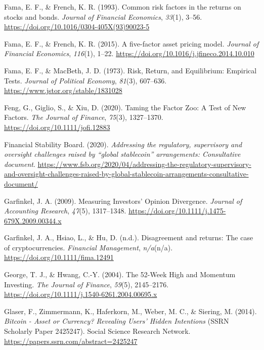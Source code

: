 \documentclass[
  12pt,
  a4paper,
  openany]{scrbook}
\newlength{\cslhangindent}
\newenvironment{CSLReferences}[2] %
 {\begin{list}{}{%
  \setlength{\itemindent}{0pt}
  \setlength{\leftmargin}{0pt}
  \setlength{\parsep}{0pt}
  \ifodd #1
   \setlength{\leftmargin}{\cslhangindent}
   \setlength{\itemindent}{-1\cslhangindent}
  \fi
  \setlength{\itemsep}{#2\baselineskip}}}
 {\end{list}}
\begin{document}
\begin{CSLReferences}{1}{0}
Fama, E. F., \& French, K. R. (1993). Common risk factors in the returns
on stocks and bonds. \emph{Journal of Financial Economics},
\emph{33}(1), 3--56. \url{https://doi.org/10.1016/0304-405X(93)90023-5}

Fama, E. F., \& French, K. R. (2015). A five-factor asset pricing model.
\emph{Journal of Financial Economics}, \emph{116}(1), 1--22.
\url{https://doi.org/10.1016/j.jfineco.2014.10.010}

Fama, E. F., \& MacBeth, J. D. (1973). Risk, Return, and Equilibrium:
Empirical Tests. \emph{Journal of Political Economy}, \emph{81}(3),
607--636. \url{https://www.jstor.org/stable/1831028}

Feng, G., Giglio, S., \& Xiu, D. (2020). Taming the Factor Zoo: A Test
of New Factors. \emph{The Journal of Finance}, \emph{75}(3), 1327--1370.
\url{https://doi.org/10.1111/jofi.12883}

Financial Stability Board. (2020). \emph{Addressing the regulatory,
supervisory and oversight challenges raised by {``global stablecoin''}
arrangements: Consultative document}.
\url{https://www.fsb.org/2020/04/addressing-the-regulatory-supervisory-and-oversight-challenges-raised-by-global-stablecoin-arrangements-consultative-document/}

Garfinkel, J. A. (2009). Measuring Investors' Opinion Divergence.
\emph{Journal of Accounting Research}, \emph{47}(5), 1317--1348.
\url{https://doi.org/10.1111/j.1475-679X.2009.00344.x}

Garfinkel, J. A., Hsiao, L., \& Hu, D. (n.d.). Disagreement and returns:
The case of cryptocurrencies. \emph{Financial Management},
\emph{n/a}(n/a). \url{https://doi.org/10.1111/fima.12491}

George, T. J., \& Hwang, C.-Y. (2004). The 52-Week High and Momentum
Investing. \emph{The Journal of Finance}, \emph{59}(5), 2145--2176.
\url{https://doi.org/10.1111/j.1540-6261.2004.00695.x}

Glaser, F., Zimmermann, K., Haferkorn, M., Weber, M. C., \& Siering, M.
(2014). \emph{Bitcoin - Asset or Currency? Revealing Users' Hidden
Intentions} (SSRN Scholarly Paper 2425247). Social Science Research
Network. \url{https://papers.ssrn.com/abstract=2425247}


\end{CSLReferences}
\end{document}
